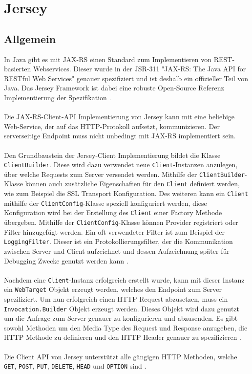 \newpage
\section{Jersey}

\subsection{Allgemein}
In Java gibt es mit JAX-RS einen Standard zum Implementieren von REST-basierten Webservices. Dieser wurde in der JSR-311 "JAX-RS: The Java API for RESTful Web Services" \cite{jsr311} genauer spezifiziert und ist deshalb ein offizieller Teil von Java. Das Jersey Framework ist dabei eine robuste Open-Source Referenz Implementierung der Spezifikation \cite{restfulWS:Kubert}.
\\\\
Die JAX-RS-Client-API Implementierung von Jersey kann mit eine beliebige Web-Service, der auf das HTTP-Protokoll aufsetzt, kommunizieren. Der serverseitige Endpoint muss nicht unbedingt mit JAX-RS implementiert sein.
\\\\
Den Grundbaustein der Jersey-Client Implementierung bildet die Klasse \texttt{ClientBuilder}. Diese wird dazu verwendet neue \texttt{Client}-Instanzen anzulegen, über welche Requests zum Server versendet werden. Mithilfe der \texttt{ClientBuilder}-Klasse können auch zusätzliche Eigenschaften für den \texttt{Client} definiert werden, wie zum Beispiel die SSL Transport Konfiguration. Des weiteren kann ein \texttt{Client} mithilfe der \texttt{ClientConfig}-Klasse speziell konfiguriert werden, diese Konfiguration wird bei der Erstellung des \texttt{Client} einer Factory Methode übergeben. Mithilfe der \texttt{ClientConfig}-Klasse können Provider registriert oder Filter hinzugefügt werden. Ein oft verwendeter Filter ist zum Beispiel der \texttt{LoggingFilter}. Dieser ist ein Protokollierungsfilter, der die Kommunikation zwischen Server und Client aufzeichnet und dessen Aufzeichnung später für Debugging Zwecke genutzt werden kann \cite{jersey:doku}. 
\\\\
Nachdem eine \texttt{Client}-Instanz erfolgreich erstellt wurde, kann mit dieser Instanz ein \texttt{WebTarget} Objekt erzeugt werden, welches den Endpoint zum Server spezifiziert. Um nun erfolgreich einen HTTP Request abzusetzen, muss ein \texttt{Invocation.Builder} Objekt erzeugt werden. Dieses Objekt wird dazu genutzt um die Anfrage zum Server genauer zu konfigurieren und abzusenden. Es gibt sowohl Methoden um den Media Type des Request und Response anzugeben, die HTTP Methode zu definieren und den HTTP Header genauer zu spezifizieren \cite{jersey:doku}.
\\\\
Die Client API von Jersey unterstützt alle gängigen HTTP Methoden, welche \texttt{GET}, \texttt{POST}, \texttt{PUT}, \texttt{DELETE}, \texttt{HEAD} und \texttt{OPTION} sind \cite{invocation:api}.

